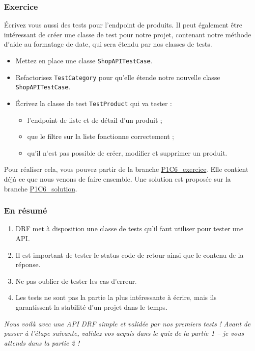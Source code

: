 \documentclass[a4paper]{article}
\begin{document}
\subsubsection*{Exercice}
Écrivez vous aussi des tests pour l’endpoint de produits. Il peut également être intéressant de créer une classe de test pour notre projet, contenant notre méthode d’aide au formatage de date, qui sera étendu par nos classes de tests.
\begin{itemize}
\item Mettez en place une classe {\tt ShopAPITestCase}.
\item Refactorisez  {\tt TestCategory}  pour qu’elle étende notre nouvelle classe  {\tt ShopAPITestCase}.
\item Écrivez la classe de test  {\tt TestProduct}  qui va tester :
\begin{itemize}
\item l’endpoint de liste et de détail d’un produit ;
\item que le filtre sur la liste fonctionne correctement ;
\item qu’il n’est pas possible de créer, modifier et supprimer un produit.
\end{itemize}
\end{itemize}
Pour réaliser cela, vous pouvez partir de la branche \href{https://github.com/OpenClassrooms-Student-Center/7192416\_APIs\_DRF/tree/P1C6\_exercice}{P1C6\_exercice}. Elle contient déjà ce que nous venons de faire ensemble. Une solution est proposée sur la branche \href{https://github.com/OpenClassrooms-Student-Center/7192416\_APIs\_DRF/tree/P1C6\_solution}{P1C6\_solution}.

\subsubsection*{En résumé}
\begin{enumerate}
\item DRF met à disposition une classe de tests qu’il faut utiliser pour tester une API.
\item Il est important de tester le status code de retour ainsi que le contenu de la réponse.
\item Ne pas oublier de tester les cas d’erreur.
\item Les tests ne sont pas la partie la plus intéressante à écrire, mais ils garantissent la stabilité d’un projet dans le temps.
\end{enumerate}
{\em Nous voilà avec une API DRF simple et validée par nos premiers tests ! Avant de passer à l’étape suivante, validez vos acquis dans le quiz de la partie 1 – je vous attends dans la partie 2 !}
\end{document}
